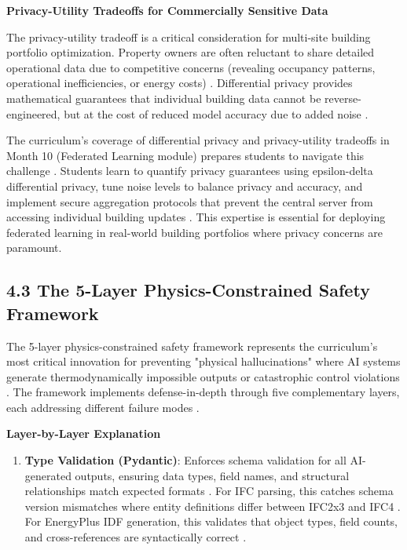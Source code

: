 \documentclass[12pt,a4paper]{article}
\begin{document}
\textbf{Privacy-Utility Tradeoffs for Commercially Sensitive Data}

The privacy-utility tradeoff is a critical consideration for multi-site building portfolio optimization. Property owners are often reluctant to share detailed operational data due to competitive concerns (revealing occupancy patterns, operational inefficiencies, or energy costs) \cite{ref166}. Differential privacy provides mathematical guarantees that individual building data cannot be reverse-engineered, but at the cost of reduced model accuracy due to added noise \cite{ref167}.

The curriculum's coverage of differential privacy and privacy-utility tradeoffs in Month 10 (Federated Learning module) prepares students to navigate this challenge \cite{ref168}. Students learn to quantify privacy guarantees using epsilon-delta differential privacy, tune noise levels to balance privacy and accuracy, and implement secure aggregation protocols that prevent the central server from accessing individual building updates \cite{ref169}. This expertise is essential for deploying federated learning in real-world building portfolios where privacy concerns are paramount.

\subsection{4.3 The 5-Layer Physics-Constrained Safety Framework}

The 5-layer physics-constrained safety framework represents the curriculum's most critical innovation for preventing "physical hallucinations" where AI systems generate thermodynamically impossible outputs or catastrophic control violations \cite{ref170}. The framework implements defense-in-depth through five complementary layers, each addressing different failure modes \cite{ref171}.

\textbf{Layer-by-Layer Explanation}

\begin{enumerate}
  \item \textbf{Type Validation (Pydantic)}: Enforces schema validation for all AI-generated outputs, ensuring data types, field names, and structural relationships match expected formats \cite{ref172}. For IFC parsing, this catches schema version mismatches where entity definitions differ between IFC2x3 and IFC4 \cite{ref173}. For EnergyPlus IDF generation, this validates that object types, field counts, and cross-references are syntactically correct \cite{ref174}.
\end{enumerate}
\end{document}
